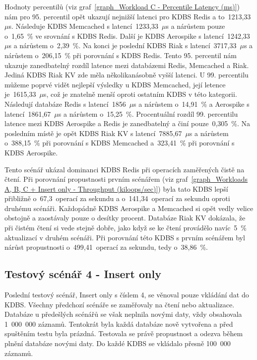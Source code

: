 \documentclass[czech,master,dept460,male,csharp,cpdeclaration]{diploma}
\begin{document}
	Hodnoty percentilů (viz graf~\ref{graph_Workload C - Percentile Latency (ms)}) nám pro 95. percentil opět ukazují nejnižší latenci pro KDBS Redis a to~1213,33~$\mu$s. Následuje KDBS Memcached s latencí~1233,33~$\mu$s a nárůstem pouze o~1,65~\% ve srovnání s KDBS Redis. Další je KDBS Aerospike s latencí~1242,33~$\mu$s a nárůstem o~2,39~\%. Na konci je poslední KDBS Riak s latencí~3717,33~$\mu$s a nárůstem o~206,15~\% při porovnání s KDBS Redis. Tento 95. percentil nám ukazuje zanedbatelný rozdíl latence mezi databázemi Redis, Memcached a Riak. Jediná KDBS Riak KV zde měla několikanásobně vyšší latenci. U 99. percentilu můžeme poprvé vidět nejlepší výsledky u KDBS Memcached, její letence je~1615,33~$\mu$s, což je znatelně menší oproti ostatním KDBS v této kategorii. Následují databáze Redis s latencí~1856~$\mu$s a nárůstem o~14,91~\% a Aerospike s latencí~1861,67~$\mu$s a nárůstem o~15,25~\%. Procentuální rozdíl 99. percentilu latence mezi KDBS Aerospike a Redis je zanedbatelný a činí pouze~0,305~\%. Na posledním místě je opět KDBS Riak KV s latencí~7885,67~$\mu$s a nárůstem o~388,15~\% při porovnání s KDBS Memcached a~323,41~\% při porovnání s KDBS Aerospike.
	
	Tento scénář ukázal dominanci KDBS Redis při operacích zaměřených čistě na čtení. Při porovnání propustnosti prvním scénářem (viz graf~\ref{graph_Workloads A, B, C + Insert only - Throughput (kiloops/sec)}) byla tato KDBS lepší přibližně o~67,3~operací za sekundu a o~141,34~operací za sekundu oproti druhému scénáři. Každopádně KDBS Aerospike a Memcached si opět vedly velice obstojně a zaostávaly pouze o desítky procent. Databáze Riak KV dokázala, že při čistém čtení si vede stejně dobře, jako když se ke čtení provádělo navíc~5~\% aktualizací v druhém scénáři. Při porovnání této KDBS s prvním scénářem byl nárůst propustnosti o~499,41~operací za sekundu, tedy o~38,86~\%.
	
	\subsection{Testový scénář 4 - Insert only} 
	
	Poslední testový scénář, Insert only s číslem 4, se věnoval pouze vkládání dat do KDBS. Všechny předchozí scénáře se zaměřovaly na čtení nebo aktualizace. Databáze u předešlých scénářů se však neplnila novými daty, vždy obsahovala 1~000~000 záznamů. Tentokrát byla každá databáze nově vytvořena a před spuštěním testu byla prázdná. Testovala se právě propustnost a odezva během plnění databáze novými daty. Do každé KDBS se vkládalo přesně 100~000 záznamů.
	
\end{document}
